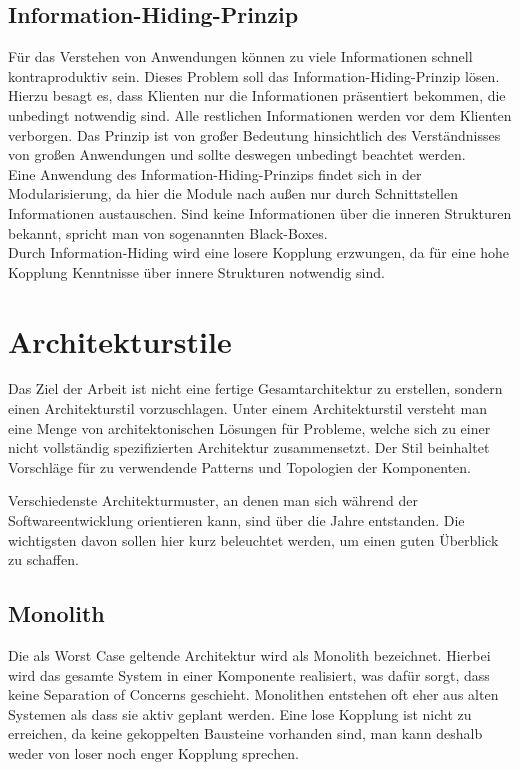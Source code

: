 \subsection{Information-Hiding-Prinzip} %
\label{sub:Information-Hiding-Prinzip}
Für das Verstehen von Anwendungen können zu viele Informationen schnell kontraproduktiv sein.
Dieses Problem soll das Information-Hiding-Prinzip lösen.
Hierzu besagt es, dass Klienten nur die Informationen präsentiert bekommen, die unbedingt notwendig sind.
Alle restlichen Informationen werden vor dem Klienten verborgen.
Das Prinzip ist von großer Bedeutung hinsichtlich des Verständnisses von großen Anwendungen und sollte deswegen unbedingt beachtet werden.~\cite{softArchGrundl}\\
Eine Anwendung des Information-Hiding-Prinzips findet sich in der Modularisierung, da hier die Module nach außen nur durch Schnittstellen Informationen austauschen.
Sind keine Informationen über die inneren Strukturen bekannt, spricht man von sogenannten Black-Boxes.~\cite{softArchGrundl}\\
Durch Information-Hiding wird eine losere Kopplung erzwungen, da für eine hohe Kopplung Kenntnisse über innere Strukturen notwendig sind.


\section{Architekturstile} %
\label{sec:Übersicht_Architekturen}
Das Ziel der Arbeit ist nicht eine fertige Gesamtarchitektur zu erstellen, sondern einen Architekturstil vorzuschlagen.
Unter einem Architekturstil versteht man eine Menge von architektonischen Lösungen für Probleme, welche sich zu einer nicht vollständig spezifizierten Architektur zusammensetzt.
Der Stil beinhaltet Vorschläge für zu verwendende Patterns und Topologien der Komponenten.~\cite{softArchInPractice}

Verschiedenste Architekturmuster, an denen man sich während der Softwareentwicklung orientieren kann, sind über die Jahre entstanden.
Die wichtigsten davon sollen hier kurz beleuchtet werden, um einen guten Überblick zu schaffen.

\subsection{Monolith} %
\label{sub:Monolith}
Die als \glq{}Worst Case\grq{} geltende Architektur wird als Monolith bezeichnet.
Hierbei wird das gesamte System in einer Komponente realisiert, was dafür sorgt, dass keine Separation of Concerns geschieht.
Monolithen entstehen oft eher aus alten Systemen als dass sie aktiv geplant werden.
Eine lose Kopplung ist nicht zu erreichen, da keine gekoppelten Bausteine vorhanden sind, man kann deshalb weder von loser noch enger Kopplung sprechen.~\cite{softArchGrundl}\\

